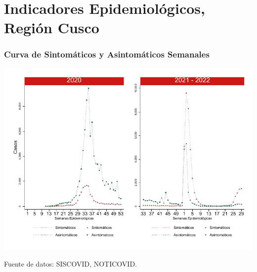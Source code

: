 \documentclass[xcolor=table]{beamer}
\begin{document}
\section{Indicadores Epidemiológicos, Región Cusco}
	\begin{frame}
		\frametitle{Curva de Sintomáticos y Asintomáticos Semanales}
		\vspace{-.5cm}
		\begin{center}
			\includegraphics[width=0.9\linewidth]{../figuras/sintomaticos_20_21_22.pdf}
		\end{center} 
		{\tiny Fuente de datos: SISCOVID, NOTICOVID.}
	\end{frame}
	
\end{document}
